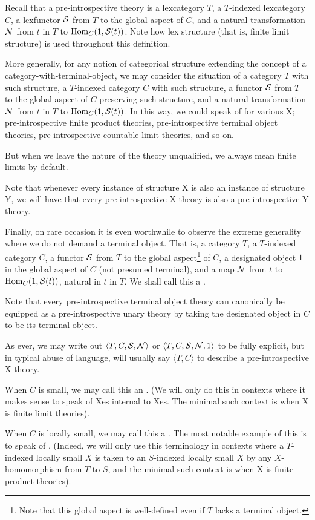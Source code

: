 \begin{definition}\label{DefnPreIntrospSNGeneralized}
Recall that a pre-introspective theory is a lexcategory $T$, a $T$-indexed lexcategory $C$, a lexfunctor $\mathcal{S}$ from $T$ to the global aspect of $C$, and a natural transformation $\mathcal{N}$ from $t$ in $T$ to $\operatorname{Hom}_C(1, \mathcal{S}(t))$. Note how lex structure (that is, finite limit structure) is used throughout this definition.

More generally, for any notion of categorical structure extending the concept of a category-with-terminal-object, we may consider the situation of a category $T$ with such structure, a $T$-indexed category $C$ with such structure, a functor $\mathcal{S}$ from $T$ to the global aspect of $C$ preserving such structure, and a natural transformation $\mathcal{N}$ from $t$ in $T$ to $\operatorname{Hom}_C(1, \mathcal{S}(t))$. In this way, we could speak of  for various X; pre-introspective finite product theories, pre-introspective terminal object theories, pre-introspective countable limit theories, and so on.

But when we leave the nature of the theory unqualified, we always mean finite limits by default.

Note that whenever every instance of structure X is also an instance of structure Y, we will have that every pre-introspective X theory is also a pre-introspective Y theory.

Finally, on rare occasion it is even worthwhile to observe the extreme generality where we do not demand a terminal object. That is, a category $T$, a $T$-indexed category $C$, a functor $\mathcal{S}$ from $T$ to the global aspect\footnote{Note that this global aspect is well-defined even if $T$ lacks a terminal object.} of $C$, a designated object $1$ in the global aspect of $C$ (not presumed terminal), and a map $\mathcal{N}$ from $t$ to $\operatorname{Hom}_C(1, \mathcal{S}(t))$, natural in $t$ in $T$. We shall call this a .

Note that every pre-introspective terminal object theory can canonically be equipped as a pre-introspective unary theory by taking the designated object in $C$ to be its terminal object.

As ever, we may write out $\langle T, C, \mathcal{S}, \mathcal{N} \rangle$ or $\langle T, C, \mathcal{S}, \mathcal{N}, 1 \rangle$ to be fully explicit, but in typical abuse of language, will usually say $\langle T, C \rangle$ to describe a pre-introspective X theory.

When $C$ is small, we may call this an . (We will only do this in contexts where it makes sense to speak of Xes internal to Xes. The minimal such context is when X is finite limit theories). 

When $C$ is locally small, we may call this a . The most notable example of this is to speak of . (Indeed, we will only use this terminology in contexts where a $T$-indexed locally small $X$ is taken to an $S$-indexed locally small $X$ by any $X$-homomorphism from $T$ to $S$, and the minimal such context is when X is finite product theories).
\end{definition}

